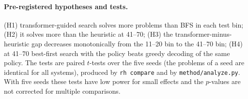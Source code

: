 \paragraph{Pre-registered hypotheses and tests.} (H1) transformer-guided search solves more problems than BFS in each test bin; (H2) it solves more than the heuristic at 41--70; (H3) the transformer-minus-heuristic gap decreases monotonically from the 11--20 bin to the 41--70 bin; (H4) at 41--70 best-first search with the policy beats greedy decoding of the same policy. The tests are paired $t$-tests over the five seeds (the problems of a seed are identical for all systems), produced by \texttt{rh compare} and by \texttt{method/analyze.py}. With five seeds these tests have low power for small effects and the $p$-values are not corrected for multiple comparisons.

\begin{table}[t]\centering\caption{Hand-heuristic variants on the tuning bin (21--35 connectives), five seeds, mean $\pm$ std.}\label{tab:tune}
\resizebox{\columnwidth}{!}{}
\end{table}
